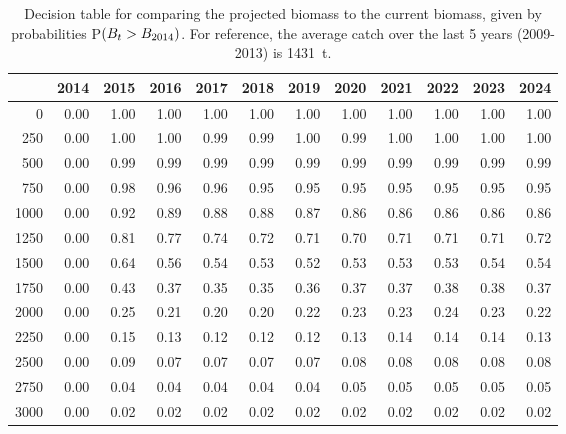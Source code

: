 \documentclass[11pt]{book}
\begin{document}
\begin{table}[!ht]
\centering
\caption{Decision table for comparing the projected biomass to the current biomass, given by probabilities P$(B_t > B_{2014})$. For reference, the average catch over the last 5 years (2009-2013) is 1431~t.} 
\label{tab:Bcurr}
\begin{tabular}{rrrrrrrrrrrr}
  \\[-1.0ex] \hline
 & 2014 & 2015 & 2016 & 2017 & 2018 & 2019 & 2020 & 2021 & 2022 & 2023 & 2024 \\ 
  \hline
0 & 0.00 & 1.00 & 1.00 & 1.00 & 1.00 & 1.00 & 1.00 & 1.00 & 1.00 & 1.00 & 1.00 \\ 
  250 & 0.00 & 1.00 & 1.00 & 0.99 & 0.99 & 1.00 & 0.99 & 1.00 & 1.00 & 1.00 & 1.00 \\ 
  500 & 0.00 & 0.99 & 0.99 & 0.99 & 0.99 & 0.99 & 0.99 & 0.99 & 0.99 & 0.99 & 0.99 \\ 
  750 & 0.00 & 0.98 & 0.96 & 0.96 & 0.95 & 0.95 & 0.95 & 0.95 & 0.95 & 0.95 & 0.95 \\ 
  1000 & 0.00 & 0.92 & 0.89 & 0.88 & 0.88 & 0.87 & 0.86 & 0.86 & 0.86 & 0.86 & 0.86 \\ 
  1250 & 0.00 & 0.81 & 0.77 & 0.74 & 0.72 & 0.71 & 0.70 & 0.71 & 0.71 & 0.71 & 0.72 \\ 
  1500 & 0.00 & 0.64 & 0.56 & 0.54 & 0.53 & 0.52 & 0.53 & 0.53 & 0.53 & 0.54 & 0.54 \\ 
  1750 & 0.00 & 0.43 & 0.37 & 0.35 & 0.35 & 0.36 & 0.37 & 0.37 & 0.38 & 0.38 & 0.37 \\ 
  2000 & 0.00 & 0.25 & 0.21 & 0.20 & 0.20 & 0.22 & 0.23 & 0.23 & 0.24 & 0.23 & 0.22 \\ 
  2250 & 0.00 & 0.15 & 0.13 & 0.12 & 0.12 & 0.12 & 0.13 & 0.14 & 0.14 & 0.14 & 0.13 \\ 
  2500 & 0.00 & 0.09 & 0.07 & 0.07 & 0.07 & 0.07 & 0.08 & 0.08 & 0.08 & 0.08 & 0.08 \\ 
  2750 & 0.00 & 0.04 & 0.04 & 0.04 & 0.04 & 0.04 & 0.05 & 0.05 & 0.05 & 0.05 & 0.05 \\ 
  3000 & 0.00 & 0.02 & 0.02 & 0.02 & 0.02 & 0.02 & 0.02 & 0.02 & 0.02 & 0.02 & 0.02 \\ 
   \hline
\end{tabular}
\end{table}%
\end{document}
